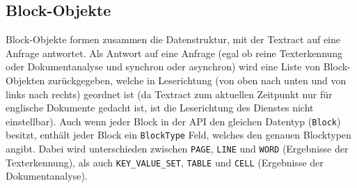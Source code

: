 \documentclass{whswinvcbook}
\begin{document}
\subsection{Block-Objekte}
Block-Objekte formen zusammen die Datenstruktur, mit der Textract auf eine Anfrage antwortet. Als Antwort auf eine Anfrage (egal ob reine Texterkennung oder Dokumentanalyse und synchron oder asynchron) wird eine Liste von Block-Objekten zurückgegeben, welche in Leserichtung (von oben nach unten und von links nach rechts) geordnet ist (da Textract zum aktuellen Zeitpunkt nur für englische Dokumente gedacht ist, ist die Leserichtung des Dienstes nicht einstellbar). Auch wenn jeder Block in der API den gleichen Datentyp (\texttt{Block}) besitzt, enthält jeder Block ein \texttt{BlockType} Feld, welches den genauen Blocktypen angibt. Dabei wird unterschieden zwischen \texttt{PAGE}, \texttt{LINE} und \texttt{WORD} (Ergebnisse der Texterkennung), als auch \texttt{KEY\_VALUE\_SET}, \texttt{TABLE} und \texttt{CELL} (Ergebnisse der Dokumentanalyse).
\end{document}
